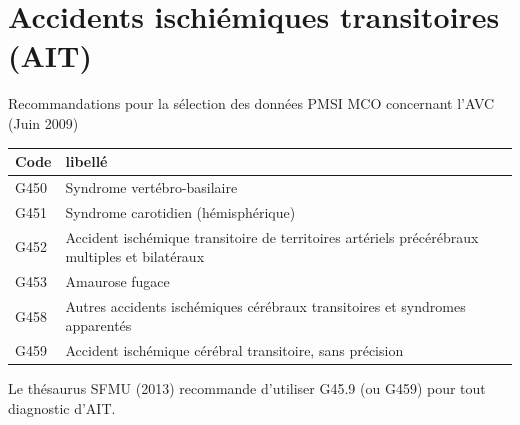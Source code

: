 \documentclass[12pt,english,french,twoside]{report}\usepackage[]{graphicx}\usepackage[]{color}
\begin{document}
\section*{Accidents ischiémiques transitoires (AIT)}

Recommandations pour la sélection des données PMSI MCO concernant l’AVC (Juin 2009)

\begin{longtable}{|l|l|}
 \hline
 Code & libellé\\
 \hline
G450 & Syndrome vertébro-basilaire \\
G451 & Syndrome carotidien (hémisphérique) \\
G452 & Accident ischémique transitoire de territoires artériels précérébraux multiples et bilatéraux \\
G453  & Amaurose fugace \\
G458  & Autres accidents ischémiques cérébraux transitoires et syndromes apparentés \\
G459  & Accident ischémique cérébral transitoire, sans précision \\  
  \hline
\end{longtable}

Le thésaurus SFMU (2013) \cite{9} recommande d'utiliser G45.9 (ou G459) pour tout diagnostic d'AIT.
\end{document}
